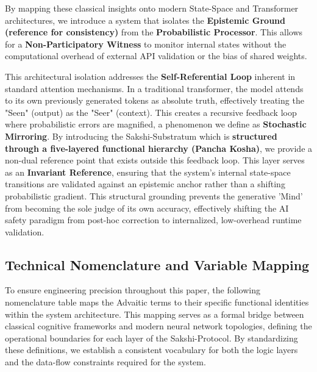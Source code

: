 \documentclass[12pt,a4paper]{article}
\begin{document}
By mapping these classical insights onto modern State-Space and Transformer architectures, we introduce a system that isolates the \textbf{Epistemic Ground (reference for consistency)} from the \textbf{Probabilistic Processor}. This allows for a \textbf{Non-Participatory Witness} to monitor internal states without the computational overhead of external API validation or the bias of shared weights.

This architectural isolation addresses the \textbf{Self-Referential Loop} inherent in standard attention mechanisms. In a traditional transformer, the model attends to its own previously generated tokens as absolute truth, effectively treating the "Seen" (output) as the "Seer" (context). This creates a recursive feedback loop where probabilistic errors are magnified, a phenomenon we define as \textbf{Stochastic Mirroring}. By introducing the Sakshi-Substratum which is \textbf{structured through a five-layered functional hierarchy (Pancha Kosha)}, we provide a non-dual reference point that exists outside this feedback loop. This layer serves as an \textbf{Invariant Reference}, ensuring that the system’s internal state-space transitions are validated against an epistemic anchor rather than a shifting probabilistic gradient. This structural grounding prevents the generative 'Mind' from becoming the sole judge of its own accuracy, effectively shifting the AI safety paradigm from post-hoc correction to internalized, low-overhead runtime validation.

\subsection{Technical Nomenclature and Variable Mapping}
To ensure engineering precision throughout this paper, the following nomenclature table maps the Advaitic terms to their specific functional identities within the system architecture. This mapping serves as a formal bridge between classical cognitive frameworks and modern neural network topologies, defining the operational boundaries for each layer of the Sakshi-Protocol. By standardizing these definitions, we establish a consistent vocabulary for both the logic layers and the data-flow constraints required for the system.
\end{document}
